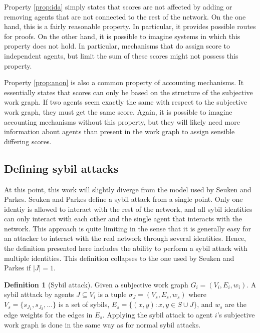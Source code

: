 \documentclass[a4paper,11pt]{book}
\theoremstyle{definition}
\newtheorem{definition}{Definition}
\begin{document}
Property \ref{prop:ida} simply states that scores are not affected by adding or removing agents
that are not connected to the rest of the network. On the one hand, this is a fairly reasonable property.
In particular, it provides possible routes for proofs. On the other hand, it is possible to imagine systems
in which this property does not hold. In particular, mechanisms that do assign score to independent agents,
but limit the sum of these scores might not possess this property.

Property \ref{prop:anon} is also a common property of accounting mechanisms. It essentially states that
scores can only be based on the structure of the subjective work graph. If two agents seem exactly the
same with respect to the subjective work graph, they must get the same score. Again, it is possible
to imagine accounting mechanisms without this property, but they will likely need more information
about agents than present in the work graph to assign sensible differing scores.

\subsection{Defining sybil attacks}

At this point, this work will slightly diverge from the model used by Seuken and Parkes. 
Seuken and Parkes define a sybil attack from a single point. Only one identiy is allowed
to interact with the rest of the network, and all sybil identities can only interact with
each other and the single agent that interacts with the network. This approach is quite
limiting in the sense that it is generally easy for an attacker to interact with the 
real network through several identities. Hence, the definition presented here
includes the ability to perform a sybil attack with multiple identities. This definition
collapses to the one used by Seuken and Parkes if $|J|=1$.

\begin{definition}[Sybil attack]
    Given a subjective work graph $G_i = (V_i, E_i, w_i)$.
    A sybil atttack by agents $J \subseteq V_i$ is a tuple $\sigma_J = (V_s, E_s, w_s)$
    where $V_s = \{ s_{J_1}, s_{J_2}, \ldots\}$ is a set of sybils, 
    $E_s = \{(x, y) : x, y \in S \cup J\}$, and $w_s$ are the edge weights for
    the edges in $E_s$. Applying the sybil attack to agent $i$'s subjective work graph
    is done in the same way as for normal sybil attacks.
    \label{def:collsybil}
\end{definition}
\end{document}
